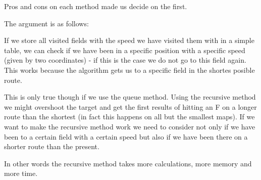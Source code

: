  Pros and cons on each method made us decide on the first.
 
 The argument is as follows:
 
 If we store all visited fields with the speed we have visited them with in a simple table, we can check if we have been in a specific position with a specific speed (given by two coordinates) - if this is the case we do not go to this field again. This works because the algorithm gets us to a specific field in the shortes posible route.
 
 This is only true though if we use the queue method. Using the recursive method we might overshoot the target and get the first results of hitting an F on a longer route than the shortest (in fact this happens on all but the smallest maps). If we want to make the recursive method work we need to consider not only if we have been to a certain field with a certain speed but also if we have been there on a shorter route than the present.
 
 In other words the recursive method takes more calculations, more memory and more time.
  
  


